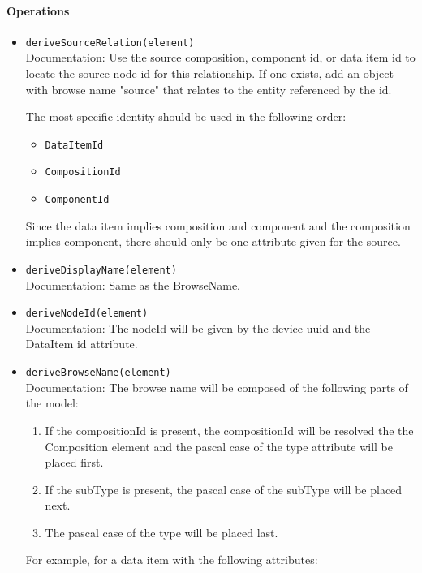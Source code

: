 \paragraph{Operations}
\begin{itemize}
  \item \texttt{deriveSourceRelation(element)}\\
    Documentation: Use the source composition,  component id, or data item id to locate the source node id for this relationship. If one exists, add an object with  browse name "source" that relates to the entity referenced by the id. 

The most specific identity should be used in the following order:
\begin{itemize}
\item \texttt{DataItemId}
\item \texttt{CompositionId}
\item \texttt{ComponentId}
\end{itemize}

Since the data item implies composition and component and the composition implies component, there should only be one attribute given for the source.

  \item \texttt{deriveDisplayName(element)}\\
    Documentation: Same as the BrowseName.

  \item \texttt{deriveNodeId(element)}\\
    Documentation: The nodeId will be given by the device uuid and the DataItem id attribute.

  \item \texttt{deriveBrowseName(element)}\\
    Documentation: The browse name will be composed of the following parts of the model:

\begin{enumerate}
\item If the compositionId is present, the compositionId will be resolved the the Composition element and the pascal case of the type attribute will be placed first.
\item If the subType is present, the pascal case of the subType will be placed next.
\item The pascal case of the type will be placed last.
\end{enumerate}

For example, for a data item with the following attributes:


\end{itemize}
